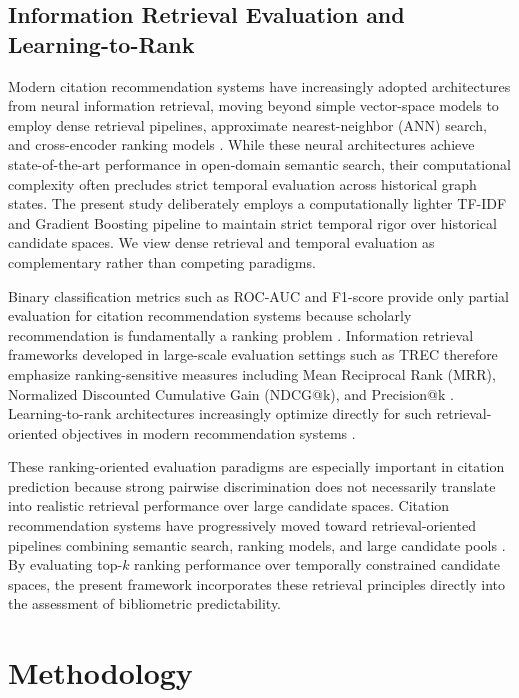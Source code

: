 \documentclass[11pt,a4paper]{article}
\begin{document}
\subsection{Information Retrieval Evaluation and Learning-to-Rank}

Modern citation recommendation systems have increasingly adopted architectures from neural information retrieval, moving beyond simple vector-space models to employ dense retrieval pipelines, approximate nearest-neighbor (ANN) search, and cross-encoder ranking models \citep{karpukhin2020dense, johnson2019billion, ostendorff2022scincl}. While these neural architectures achieve state-of-the-art performance in open-domain semantic search, their computational complexity often precludes strict temporal evaluation across historical graph states. The present study deliberately employs a computationally lighter TF-IDF and Gradient Boosting pipeline to maintain strict temporal rigor over historical candidate spaces. We view dense retrieval and temporal evaluation as complementary rather than competing paradigms.

Binary classification metrics such as ROC-AUC and F1-score provide only partial evaluation for citation recommendation systems because scholarly recommendation is fundamentally a ranking problem \citep{manning2008introduction, powers2011evaluation}. Information retrieval frameworks developed in large-scale evaluation settings such as TREC \citep{voorhees2005trec} therefore emphasize ranking-sensitive measures including Mean Reciprocal Rank (MRR), Normalized Discounted Cumulative Gain (NDCG@k), and Precision@k \citep{jarvelin2002cumulated}. Learning-to-rank architectures increasingly optimize directly for such retrieval-oriented objectives in modern recommendation systems \citep{liu2009learning}.

These ranking-oriented evaluation paradigms are especially important in citation prediction because strong pairwise discrimination does not necessarily translate into realistic retrieval performance over large candidate spaces. Citation recommendation systems have progressively moved toward retrieval-oriented pipelines combining semantic search, ranking models, and large candidate pools \citep{beel2016paper}. By evaluating top-\(k\) ranking performance over temporally constrained candidate spaces, the present framework incorporates these retrieval principles directly into the assessment of bibliometric predictability.

\section{Methodology}
\label{sec:method}
\end{document}
